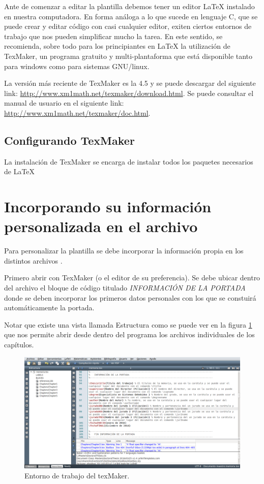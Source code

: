 Ante de comenzar a editar la plantilla debemos tener un editor \LaTeX{} instalado en nuestra computadora.  En forma análoga a lo que sucede en lenguaje C, que se puede crear y editar código con casi cualquier editor, exiten ciertos entornos de trabajo que nos pueden simplificar mucho la tarea.  En este sentido, se recomienda, sobre todo para los principiantes en \LaTeX{} la utilización de TexMaker, un programa gratuito y multi-plantaforma que está disponible tanto para windows como para sistemas GNU/linux.

La versión más reciente de TexMaker es la 4.5 y se puede descargar del siguiente link: \url{http://www.xm1math.net/texmaker/download.html}. Se puede consultar el manual de usuario en el siguiente link: \url{http://www.xm1math.net/texmaker/doc.html}.

\subsection{Configurando TexMaker}

La instalación de TexMaker se encarga de instalar todos los paquetes necesarios de \LaTeX{}

\section{Incorporando su información personalizada en el archivo }
\label{sec:FillingFile}

Para personalizar la plantilla se debe incorporar la información propia en los distintos archivos . 

Primero abrir  con TexMaker (o el editor de su preferencia). Se debe ubicar dentro del archivo el bloque de código titulado \emph{INFORMACIÓN DE LA PORTADA} donde se deben incorporar los primeros datos personales con los que se constuirá automáticamente la portada.

Notar que existe una vista llamada Estructura como se puede ver en la figura \ref{fig:texmaker} que nos permite abrir desde dentro del programa los archivos individuales de los capítulos.

\begin{figure}[h]
	\centering
	\includegraphics[width=\textwidth]{./Figures/texmaker.png}
	\caption{Entorno de trabajo del texMaker.}
	\label{fig:texmaker}
\end{figure}

